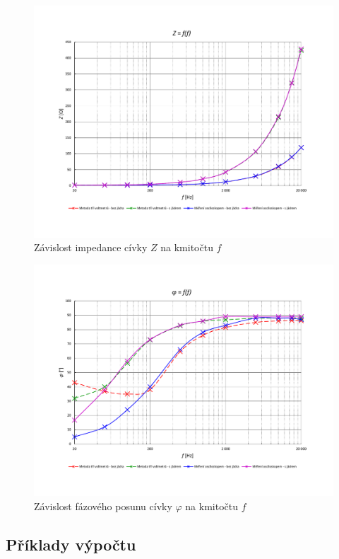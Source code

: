 \documentclass[a4paper, czech]{article}
\begin{document}
\begin{figure}[H]
    \centering
    \includegraphics[width=\textwidth, trim={0 2.5cm 0 3cm}]{grafy/9B_graf3.pdf}
    \caption{Závislost impedance cívky $Z$ na kmitočtu $f$}
\end{figure}

\begin{figure}[H]
    \centering
    \includegraphics[width=\textwidth, trim={0 2.5cm 0 3cm}]{grafy/9B_graf4.pdf}
    \caption{Závislost fázového posunu cívky $\varphi$ na kmitočtu $f$}
\end{figure}

\subsection{Příklady výpočtu}
\end{document}
